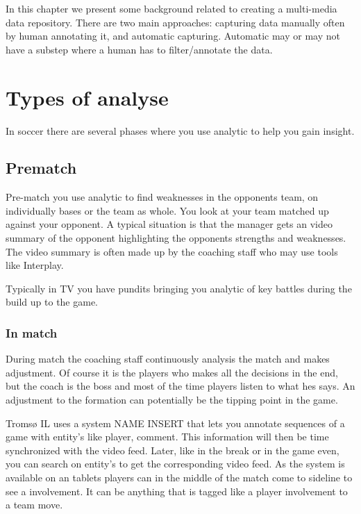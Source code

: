 

In this chapter we present some background related to creating a multi-media data repository. There are two main approaches: capturing data manually often by human annotating it, and automatic capturing. Automatic may or may not have a substep where a human has to filter/annotate the data. 


\section{Types of analyse}

In soccer there are several phases where you use analytic to help you gain insight. 

\subsection{Prematch}

Pre-match you use analytic to find weaknesses in the opponents team, on individually bases or the team as whole. You look at your team matched up against your opponent. A typical situation is that the manager gets an video summary of the opponent highlighting the opponents strengths and weaknesses. The video summary is often made up by the coaching staff who may use tools like Interplay. 

Typically in TV you have pundits bringing you analytic of key battles during the build up to the game. 


\subsubsection{In match}

During match the coaching staff continuously analysis the match and makes adjustment. Of course it is the players who makes all the decisions in the end, but the coach is the boss and most of the time players listen to what hes says. An adjustment to the formation can potentially be the tipping point in the game.

Tromsø IL uses a system NAME INSERT that lets you annotate sequences of a game with entity's like player, comment. This information will then be time synchronized with the video feed. Later, like in the break or in the game even, you can search on entity's to get the  corresponding video feed. As the system is available on an tablets players can in the middle of the match come to sideline to see a involvement. It can be anything that is tagged like a player involvement to a team move.

